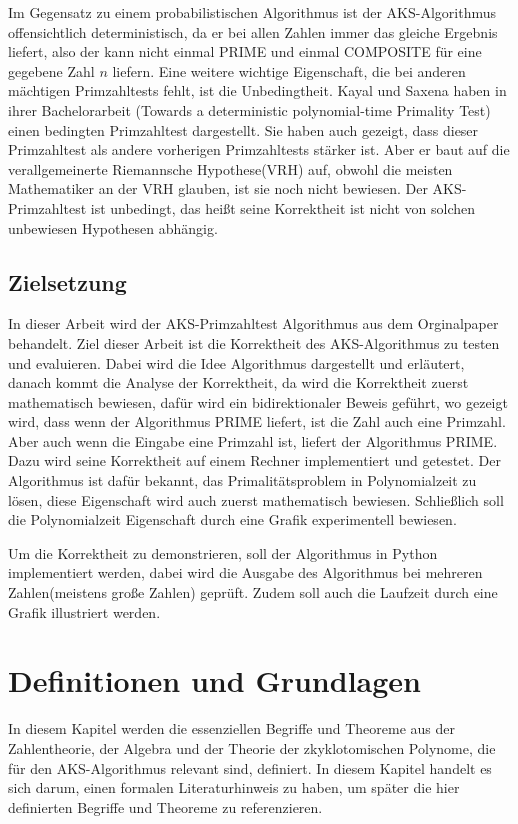 \documentclass[12pt,oneside]{article}
\theoremstyle{remark}
\theoremstyle{definition}
\begin{document}
Im Gegensatz zu einem probabilistischen Algorithmus ist der AKS-Algorithmus offensichtlich deterministisch, da er bei allen Zahlen immer das gleiche Ergebnis liefert, also der kann nicht einmal PRIME und einmal COMPOSITE für eine gegebene Zahl $n$ liefern.\newline
Eine weitere wichtige Eigenschaft, die bei anderen mächtigen Primzahltests fehlt, ist die Unbedingtheit. Kayal und Saxena haben in ihrer Bachelorarbeit (Towards a deterministic polynomial-time Primality Test) einen bedingten Primzahltest dargestellt. Sie haben auch gezeigt, dass dieser Primzahltest als andere vorherigen Primzahltests stärker ist. Aber er baut auf die verallgemeinerte Riemannsche Hypothese(VRH) auf, obwohl die meisten Mathematiker an der VRH glauben, ist sie noch nicht bewiesen. Der AKS-Primzahltest ist unbedingt, das heißt seine Korrektheit ist nicht von solchen unbewiesen Hypothesen abhängig.       

\subsection{Zielsetzung}
In dieser Arbeit wird der AKS-Primzahltest Algorithmus aus dem Orginalpaper behandelt. Ziel dieser Arbeit ist die Korrektheit des AKS-Algorithmus zu testen und evaluieren. Dabei wird die Idee Algorithmus dargestellt und erläutert, danach kommt die Analyse der Korrektheit, da wird die Korrektheit zuerst mathematisch bewiesen, dafür wird ein bidirektionaler Beweis geführt, wo gezeigt wird, dass wenn der Algorithmus PRIME liefert, ist die Zahl auch eine Primzahl. Aber auch wenn die Eingabe eine Primzahl ist, liefert der Algorithmus PRIME. Dazu wird seine Korrektheit auf einem Rechner implementiert und getestet. Der Algorithmus ist dafür bekannt, das Primalitätsproblem in Polynomialzeit zu lösen, diese Eigenschaft wird auch zuerst mathematisch bewiesen. Schließlich soll die Polynomialzeit Eigenschaft durch eine Grafik experimentell bewiesen.  

Um die Korrektheit zu demonstrieren, soll der Algorithmus in Python implementiert werden, dabei wird die Ausgabe des Algorithmus bei mehreren Zahlen(meistens große Zahlen) geprüft. Zudem soll auch die Laufzeit durch eine Grafik illustriert werden.  


\section{Definitionen und Grundlagen}
In diesem Kapitel werden die essenziellen Begriffe und Theoreme aus der Zahlentheorie, der Algebra und der Theorie der zkyklotomischen Polynome, die für den AKS-Algorithmus relevant sind, definiert. In diesem Kapitel handelt es sich darum, einen formalen Literaturhinweis zu haben, um später die hier definierten Begriffe und Theoreme zu referenzieren.
\end{document}
